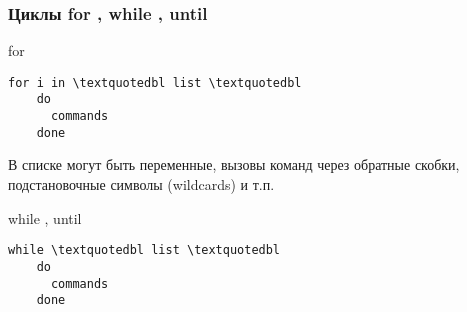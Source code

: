 \begin{frame}[fragile]
  \frametitle{Циклы \textquotedbl for \textquotedbl , \textquotedbl while \textquotedbl , \textquotedbl until \textquotedbl}
      \alert{for}
\begin{lstlisting}[basicstyle=\normalsize]
	for i in \textquotedbl list \textquotedbl
	do
	  commands
	done
\end{lstlisting}
      В списке могут быть переменные, вызовы команд через обратные скобки, подстановочные символы (wildcards) и т.п.\pause
  
      \alert{while , until}
\begin{lstlisting}[basicstyle=\normalsize]
	while \textquotedbl list \textquotedbl
	do
	  commands
	done
\end{lstlisting} 
\end{frame}
